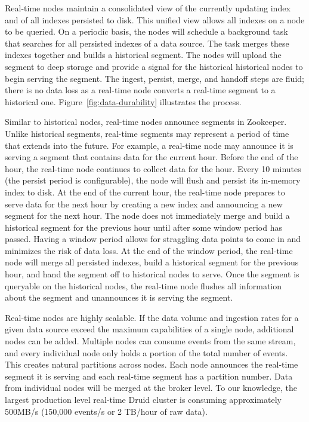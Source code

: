 \documentclass{vldb}
\begin{document}
Real-time nodes maintain a consolidated view of the currently updating
index and of all indexes persisted to disk. This unified view allows
all indexes on a node to be queried. On a periodic basis, the nodes will
schedule a background task that searches for all persisted indexes of
a data source. The task merges these indexes together and builds a
historical segment. The nodes will upload the segment to deep storage
and provide a signal for the historical historical nodes to begin serving
the segment. The ingest, persist, merge, and handoff steps are fluid;
there is no data loss as a real-time node converts a real-time segment
to a historical one. Figure~\ref{fig:data-durability} illustrates the process.

Similar to historical nodes, real-time nodes announce segments in
Zookeeper. Unlike historical segments, real-time segments may
represent a period of time that extends into the future. For example,
a real-time node may announce it is serving a segment that contains
data for the current hour. Before the end of the hour, the real-time
node continues to collect data for the hour. Every 10 minutes (the
persist period is configurable), the node will flush and persist its
in-memory index to disk. At the end of the current hour, the real-time
node prepares to serve data for the next hour by creating a new index
and announcing a new segment for the next hour. The node does not
immediately merge and build a historical segment for the previous hour
until after some window period has passed. Having a window period
allows for straggling data points to come in and minimizes the risk of
data loss. At the end of the window period, the real-time node will
merge all persisted indexes, build a historical segment for the
previous hour, and hand the segment off to historical nodes to
serve. Once the segment is queryable on the historical nodes, the
real-time node flushes all information about the segment and
unannounces it is serving the segment.

Real-time nodes are highly scalable. If the data volume and ingestion
rates for a given data source exceed the maximum capabilities of a
single node, additional nodes can be added.  Multiple nodes can
consume events from the same stream, and every individual node only
holds a portion of the total number of events.  This creates natural
partitions across nodes. Each node announces the real-time segment it
is serving and each real-time segment has a partition number.  Data
from individual nodes will be merged at the broker level.  To our
knowledge, the largest production level real-time Druid cluster is
consuming approximately 500MB/s (150,000 events/s or 2 TB/hour of raw data).
\end{document}
